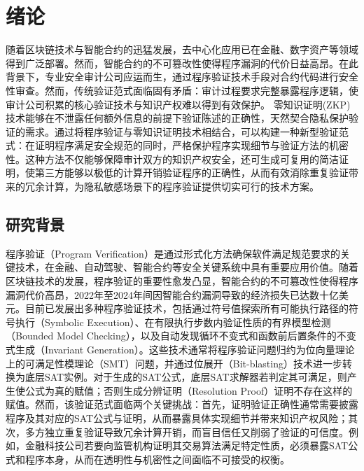 
\chapter{绪论}
随着区块链技术与智能合约的迅猛发展，去中心化应用已在金融、数字资产等领域得到广泛部署\cite{10.1145/3716323}。然而，智能合约的不可篡改性使得程序漏洞的代价日益高昂。在此背景下，专业安全审计公司应运而生，通过程序验证技术手段对合约代码进行安全性审查\cite{VIDAL2024112160}。然而，传统验证范式面临固有矛盾：审计过程要求完整暴露程序逻辑，使审计公司积累的核心验证技术与知识产权难以得到有效保护\cite{mota2023formallyverifyingrealworld}。
零知识证明(ZKP)技术能够在不泄露任何额外信息的前提下验证陈述的正确性\cite{sheybani2025zeroknowledgeproofframeworkssystematic}，天然契合隐私保护验证的需求。通过将程序验证与零知识证明技术相结合，可以构建一种新型验证范式：在证明程序满足安全规范的同时，严格保护程序实现细节与验证方法的机密性。\cite{10.1007/978-3-030-45721-1_24}这种方法不仅能够保障审计双方的知识产权安全，还可生成可复用的简洁证明，使第三方能够以极低的计算开销验证程序的正确性，从而有效消除重复验证带来的冗余计算，为隐私敏感场景下的程序验证提供切实可行的技术方案。

\section{研究背景}
程序验证（Program Verification）是通过形式化方法确保软件满足规范要求的关键技术，在金融、自动驾驶、智能合约等安全关键系统中具有重要应用价值\cite{10.1145/3605098.3636008, 10.1007/978-3-030-65277-7_5, BORCHERS2025103256}。随着区块链技术的发展，程序验证的重要性愈发凸显，智能合约的不可篡改性使得程序漏洞代价高昂，2022年至2024年间因智能合约漏洞导致的经济损失已达数十亿美元\cite{gogol2024sokdecentralizedfinancedefi}。目前已发展出多种程序验证技术，包括通过符号值探索所有可能执行路径\cite{10.1007/978-3-031-76554-4_13}的符号执行（Symbolic Execution）、在有限执行步数内验证性质\cite{10.1007/978-3-540-45069-6_2}的有界模型检测（Bounded Model Checking），以及自动发现循环不变式和函数前后置条件\cite{beyer2024augmentinginterpolationbasedmodelchecking}的不变式生成（Invariant Generation）。这些技术通常将程序验证问题归约为位向量理论上的可满足性模理论（SMT）问题，并通过位展开（Bit-blasting）技术进一步转换为底层SAT实例\cite{10.1145/3597926.3598034}。对于生成的SAT公式，底层SAT求解器若判定其可满足，则产生使公式为真的赋值；否则生成分辨证明（Resolution Proof）证明不存在这样的赋值。然而，该验证范式面临两个关键挑战：首先，证明验证正确性通常需要披露程序及其对应的SAT公式与证明，从而暴露具体实现细节并带来知识产权风险；其次，多方独立重复验证导致冗余计算开销，而盲目信任又削弱了验证的可信度。例如，金融科技公司若要向监管机构证明其交易算法满足特定性质，必须暴露SAT公式和程序本身，从而在透明性与机密性之间面临不可接受的权衡。

